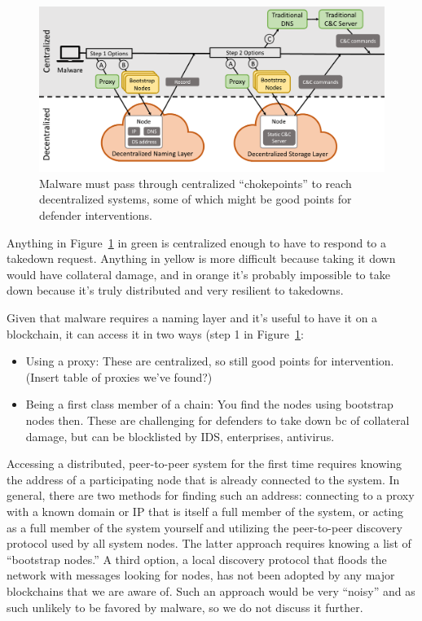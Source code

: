 \documentclass[10pt,sigconf,letterpaper]{acmart}
\begin{document}
\begin{figure}[t]
	\centering
	\includegraphics[width=\textwidth]{figs/malware_contacting_cnc.pdf}
	\caption{Malware must pass through centralized ``chokepoints'' to reach 
		decentralized systems, some of which might be good points for defender 
		interventions.}
	\label{fig:malware_contacting_cnc}
\end{figure}

Anything in Figure~\ref{fig:malware_contacting_cnc} in green is centralized 
enough to have to respond to a takedown request. Anything in yellow is 
more difficult because taking it down would have collateral damage, and in 
orange it's probably impossible to take down because it's truly distributed and 
very resilient to takedowns.

Given that malware requires a naming layer and it’s useful to have it on a 
blockchain, it can access it in two ways (step 1 in 
Figure~\ref{fig:malware_contacting_cnc}:
\begin{itemize}
	\item Using a proxy: These are centralized, so still good points for 
	intervention. (Insert table of proxies we've found?)
	\item Being a first class member of a chain: You find the nodes using 
	bootstrap nodes then. These are challenging for defenders to take down bc 
	of collateral damage, but can be blocklisted by IDS, 
	enterprises, antivirus. 
\end{itemize}

Accessing a distributed, peer-to-peer system for the first 
time requires knowing the address of a participating node 
that is already connected to the system. In general, there 
are two methods for finding such an address: connecting to a 
proxy with a known domain or IP that is itself a full member 
of the system, or acting as a full member of the system 
yourself and utilizing the peer-to-peer discovery protocol 
used by all system nodes. The latter approach requires 
knowing a list of ``bootstrap nodes.'' A third option, a 
local discovery protocol that floods the network with 
messages looking for nodes, has not been adopted by any major 
blockchains that we are aware of. Such an approach would be 
very ``noisy'' and as such unlikely to be favored by malware, 
so we do not discuss it further.
\end{document}
